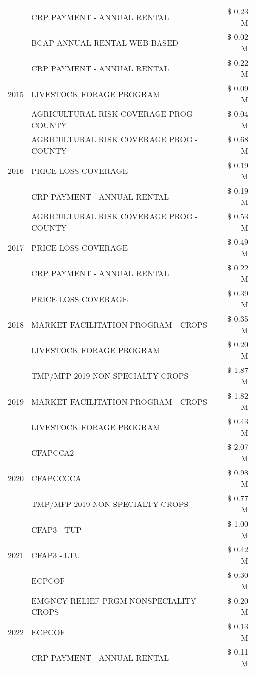 \begin{tabular}{llr}
 & CRP PAYMENT - ANNUAL RENTAL & \$ 0.23 M \\
 & BCAP ANNUAL RENTAL WEB BASED & \$ 0.02 M \\
\cline{1-3}
\multirow[t]{3}{*}{2015} & CRP PAYMENT - ANNUAL RENTAL & \$ 0.22 M \\
 & LIVESTOCK FORAGE PROGRAM & \$ 0.09 M \\
 & AGRICULTURAL RISK COVERAGE PROG - COUNTY & \$ 0.04 M \\
\cline{1-3}
\multirow[t]{3}{*}{2016} & AGRICULTURAL RISK COVERAGE PROG - COUNTY & \$ 0.68 M \\
 & PRICE LOSS COVERAGE & \$ 0.19 M \\
 & CRP PAYMENT - ANNUAL RENTAL & \$ 0.19 M \\
\cline{1-3}
\multirow[t]{3}{*}{2017} & AGRICULTURAL RISK COVERAGE PROG - COUNTY & \$ 0.53 M \\
 & PRICE LOSS COVERAGE & \$ 0.49 M \\
 & CRP PAYMENT - ANNUAL RENTAL & \$ 0.22 M \\
\cline{1-3}
\multirow[t]{3}{*}{2018} & PRICE LOSS COVERAGE & \$ 0.39 M \\
 & MARKET FACILITATION PROGRAM - CROPS & \$ 0.35 M \\
 & LIVESTOCK FORAGE PROGRAM & \$ 0.20 M \\
\cline{1-3}
\multirow[t]{3}{*}{2019} & TMP/MFP 2019 NON SPECIALTY CROPS & \$ 1.87 M \\
 & MARKET FACILITATION PROGRAM - CROPS & \$ 1.82 M \\
 & LIVESTOCK FORAGE PROGRAM & \$ 0.43 M \\
\cline{1-3}
\multirow[t]{3}{*}{2020} & CFAPCCA2 & \$ 2.07 M \\
 & CFAPCCCCA & \$ 0.98 M \\
 & TMP/MFP 2019 NON SPECIALTY CROPS & \$ 0.77 M \\
\cline{1-3}
\multirow[t]{3}{*}{2021} & CFAP3 - TUP & \$ 1.00 M \\
 & CFAP3 - LTU & \$ 0.42 M \\
 & ECPCOF & \$ 0.30 M \\
\cline{1-3}
\multirow[t]{3}{*}{2022} & EMGNCY RELIEF PRGM-NONSPECIALITY CROPS & \$ 0.20 M \\
 & ECPCOF & \$ 0.13 M \\
 & CRP PAYMENT - ANNUAL RENTAL & \$ 0.11 M \\
\cline{1-3}
\bottomrule
\end{tabular}

